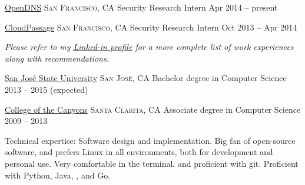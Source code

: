 \documentclass[10pt]{article}
\begin{document}
\spacedhrule{0em}{-0.4em}


\headedsection  %
  {\href{http://www.opendns.com}{OpenDNS}}
  {\textsc{San Francisco, CA}} {%
  \headedsubsection
    {Security Research Intern}
    {Apr 2014 -- present}
    {}
}

\headedsection  %
  {\href{http://www.cloudpassage.com}{CloudPassage}}
  {\textsc{San Francisco, CA}} {%
  \headedsubsection
    {Security Research Intern}
    {Oct 2013 -- Apr 2014}
    {}
}

\vspace{-0.2em}
\begin{center}
  \emph{\small Please refer to my \href{http://www.linkedin.com/in/skylerhawthorne}{Linked-in profile} for a more complete list of work experiences along with recommendations.}
\end{center}


\spacedhrule{-0.2em}{-0.4em}


\headedsection
  {\href{http://www.sjsu.edu/}{San Jos\'{e} State University}}
  {\textsc{San Jos\'{e}, CA}} {%
  \headedsubsection
    {Bachelor degree in Computer Science}
    {2013 -- 2015 (expected)}
    {}
}

\headedsection
  {\href{http://www.canyons.edu/}{College of the Canyons}}
  {\textsc{Santa Clarita, CA}} {%
  \headedsubsection
    {Associate degree in Computer Science}
    {2009 -- 2013} {}
}

\spacedhrule{0.5em}{-0.4em}


\inlineheadsection  %
  {Technical expertise:}
  {Software design and implementation. Big fan of open-source software, and prefers Linux in all environments, both for development and personal use. Very comfortable in the terminal, and proficient with git. Proficient with Python, Java, \CPP, and Go.}
\end{document}
